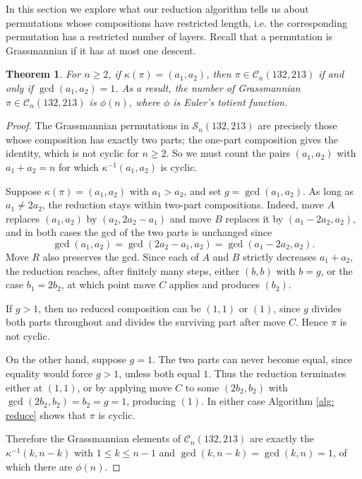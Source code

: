 \documentclass[11pt]{article}
\renewcommand\S{\mathcal S}
\newcommand\C{\mathcal C}
\newtheorem{theorem}{Theorem}[section]
\theoremstyle{definition}
\begin{document}
In this section we explore what our reduction algorithm tells us about permutations whose compositions have restricted length, i.e. the corresponding permutation has a restricted number of layers. Recall that a permutation is Grassmannian if it has at most one descent.

\begin{theorem} \label{thm: two-parts}
    For $n \geq 2$, if $\kappa(\pi) = (a_1,a_2)$, then $\pi \in \C_n(132,213)$ if and only if $\gcd(a_1,a_2) = 1$. As a result, the number of Grassmannian $\pi \in \C_n(132,213)$ is $\phi(n)$, where $\phi$ is Euler's totient function.
\end{theorem}

\begin{proof}
    The Grassmannian permutations in $\S_n(132,213)$ are precisely those whose composition has exactly two parts; the one-part composition gives the identity, which is not cyclic for $n \ge 2$. So we must count the pairs $(a_1,a_2)$ with $a_1 + a_2 = n$ for which $\kappa^{-1}(a_1,a_2)$ is cyclic.

    Suppose $\kappa(\pi) = (a_1,a_2)$ with $a_1 > a_2$, and set $g = \gcd(a_1,a_2)$. As long as $a_1 \neq 2a_2$, the reduction stays within two-part compositions. Indeed, move $A$ replaces $(a_1,a_2)$ by $(a_2, 2a_2-a_1)$ and move $B$ replaces it by $(a_1-2a_2,a_2)$, and in both cases the gcd of the two parts is unchanged since 
    \[
    \gcd(a_1,a_2) = \gcd(2a_2-a_1,a_2) = \gcd(a_1-2a_2,a_2).
    \] 
    Move $R$ also preserves the gcd. Since each of $A$ and $B$ strictly decreases $a_1+a_2$, the reduction reaches, after finitely many steps, either $(b,b)$ with $b = g$, or the case $b_1 = 2b_2$, at which point move $C$ applies and produces $(b_2)$.

    If $g > 1$, then no reduced composition can be $(1,1)$ or $(1)$, since $g$ divides both parts throughout and divides the surviving part after move $C$. Hence $\pi$ is not cyclic.

    On the other hand, suppose $g = 1$. The two parts can never become equal, since equality would force $g > 1$, unless both equal $1$. Thus the reduction terminates either at $(1,1)$, or by applying move $C$ to some $(2b_2,b_2)$ with $\gcd(2b_2,b_2) = b_2 = g = 1$, producing $(1)$. In either case Algorithm \ref{alg: reduce} shows that $\pi$ is cyclic.

    Therefore the Grassmannian elements of $\C_n(132,213)$ are exactly the $\kappa^{-1}(k,n-k)$ with $1 \le k \le n-1$ and $\gcd(k,n-k) = \gcd(k,n) = 1$, of which there are $\phi(n)$.
\end{proof}
\end{document}
